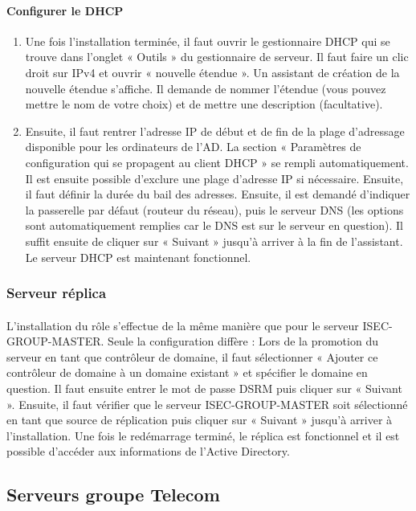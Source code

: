			\paragraph{Configurer le DHCP}
				\begin{enumerate}
					\item Une fois l’installation terminée, il faut ouvrir le gestionnaire DHCP qui se trouve dans l’onglet « Outils » du gestionnaire de serveur. Il faut faire un clic droit sur IPv4 et ouvrir « nouvelle étendue ». Un assistant de création de la nouvelle étendue s’affiche. Il demande de nommer l’étendue (vous pouvez mettre le nom de votre choix) et de mettre une description (facultative). 
					\item Ensuite, il faut rentrer l’adresse IP de début et de fin de la plage d’adressage disponible pour les ordinateurs de l’AD. La section « Paramètres de configuration qui se propagent au client DHCP » se rempli automatiquement. Il est ensuite possible d’exclure une plage d’adresse IP si nécessaire. Ensuite, il faut définir la durée du bail des adresses. Ensuite, il est demandé d’indiquer la passerelle par défaut (routeur du réseau), puis le serveur DNS (les options sont automatiquement remplies car le DNS est sur le serveur en question). Il suffit ensuite de cliquer sur « Suivant » jusqu’à arriver à la fin de l’assistant. Le serveur DHCP est maintenant fonctionnel.
				\end{enumerate}

		\subsubsection{Serveur réplica}
			\paragraph{}
				L’installation du rôle s’effectue de la même manière que pour le serveur ISEC-GROUP-MASTER. Seule la configuration diffère : Lors de la promotion du serveur en tant que contrôleur de domaine, il faut sélectionner « Ajouter ce contrôleur de domaine à un domaine existant » et spécifier le domaine en question. Il faut ensuite entrer le mot de passe DSRM puis cliquer sur « Suivant ». Ensuite, il faut vérifier que le serveur ISEC-GROUP-MASTER soit sélectionné en tant que source de réplication puis cliquer sur « Suivant » jusqu’à arriver à l’installation. Une fois le redémarrage terminé, le réplica est fonctionnel et il est possible d’accéder aux informations de l’Active Directory.
	\subsection{Serveurs groupe Telecom}
